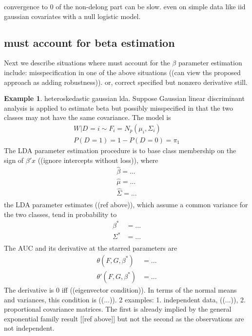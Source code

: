 \documentclass[12pt]{article}
\renewcommand{\P}{P}
\newcommand{\W}[1][]{W_{#1}}
\newcommand{\D}[1][]{D_{#1}}
\renewcommand{\star}[1]{{#1}^\ast}
\newcommand{\F}{F}
\newcommand{\G}{G}
\newcommand{\auc}{\theta}
\theoremstyle{definition}
\newtheorem{example}{Example}%
\begin{document}
convergence to 0 of the non-delong part can be slow. even on simple
data like iid gaussian covariates with a null logistic model.


\subsection{must account for beta estimation}
Next we describe situations where must account for the $\beta$ parameter estimation
include: misspecification in one of the above situations ((can view
ths proposed approach as adding robustness)). or, correct specified
but nonzero derivative still.

\begin{example} heteroskedastic gaussian lda.  Suppose Gaussian linear
  discriminant analysis is applied to estimate beta but possibly misspecified
  in that the two classes may not have the same covariance. The model
  is
  \begin{align}
    \W | \D=i \sim \F_i=N_p(\mu_i,\Sigma_i)\\
    \P(\D=1)=1-P(\D=0)=\pi_1
  \end{align}
  The LDA parameter estimation procedure is to base class membership on the sign of $\beta'x$
  ((ignore intercepts without loss)), where
  \begin{align}
    \hat\beta=...\\
    \hat\mu=...\\
    \hat\Sigma = ...\\
  \end{align}
  the LDA parameter estimates ((ref above)), which assume a common variance for the two classes, tend in probability to
  \begin{align}
    \star\beta &=...\\
    \star\Sigma &= ...\\
  \end{align}
  The AUC and its derivative at the starred parameters are
  \begin{align}
    \auc(\F,\G,\star{\beta}) &=...\\
    \auc'(\F,\G,\star{\beta}) &= ...
  \end{align}
  The derivative is $0$ iff ((eigenvector condition)). In terms of the
  normal means and variances, this condition is ((...)). 2 examples:
  1. independent data, ((...)), 2. proportional covariance
  matrices. The first is already implied by the general exponential
  family result [[ref above]] but not the second as the observations
  are not independent.


\end{example}
\end{document}
